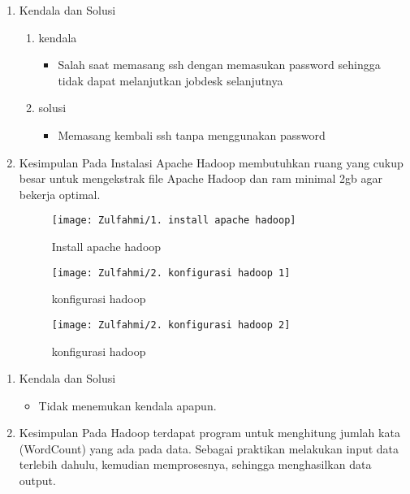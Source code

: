 

\begin{enumerate}

\item Kendala dan Solusi
\begin{enumerate}
    \item kendala
\begin{itemize}
    \item Salah saat memasang ssh dengan memasukan password sehingga tidak dapat melanjutkan jobdesk selanjutnya
\end{itemize}
    \item solusi
\begin{itemize}
    \item Memasang kembali ssh tanpa menggunakan password
\end{itemize}
\end{enumerate}

\item Kesimpulan
\newline
    Pada Instalasi Apache Hadoop membutuhkan ruang yang
    cukup besar untuk mengekstrak file Apache Hadoop dan ram
    minimal 2gb agar bekerja optimal.


\begin{figure}[!ht]
    \texttt{[image: Zulfahmi/1. install apache hadoop]}
    \caption{Install apache hadoop}
    \label{gam:Hasil}
\end{figure}

\begin{figure}[!ht]
    \texttt{[image: Zulfahmi/2. konfigurasi hadoop 1]}
    \caption{konfigurasi hadoop}
    \label{gam:Hasil}
\end{figure}

\begin{figure}[!ht]
    \texttt{[image: Zulfahmi/2. konfigurasi hadoop 2]}
    \caption{konfigurasi hadoop}
    \label{gam:Hasil}
\end{figure}


\end{enumerate}

\clearpage
{}
\begin{enumerate}
\item Kendala dan Solusi

\begin{itemize}
\item Tidak menemukan kendala apapun.
\end{itemize}

\item Kesimpulan
\newline
    Pada Hadoop terdapat program untuk menghitung jumlah kata 
    (WordCount) yang ada pada data. Sebagai praktikan melakukan input data terlebih
    dahulu, kemudian memprosesnya, sehingga menghasilkan data output.

\end{enumerate}

